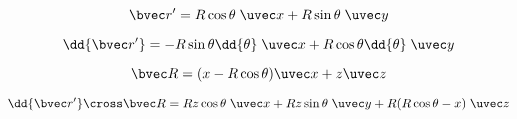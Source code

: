 
\begin{issues}
\issueDraft
\end{issues}

\begin{equation}
\bvec r' = R\cos\theta\; \uvec x + R\sin\theta\; \uvec y
\end{equation}

\begin{equation}
\dd{\bvec r'} = -R\sin \theta \dd{\theta}\; \uvec x + R\cos \theta \dd{\theta}\; \uvec y
\end{equation}

\begin{equation}
\bvec R = (x - R\cos\theta)\uvec x + z \uvec z
\end{equation}

\begin{equation}
\dd{\bvec r'} \cross \bvec R = Rz \cos\theta \;\uvec x + Rz\sin\theta \;\uvec y + R(R \cos\theta - x)\;\uvec z
\end{equation}

